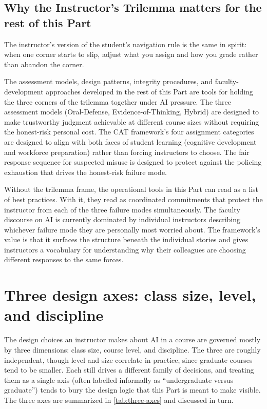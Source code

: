 \documentclass{SIAMbook2023}
\begin{document}
\subsection{Why the Instructor's Trilemma matters for the rest of this Part}
\label{i:subsec:trilemma-stakes}

The instructor's version of the student's navigation rule is the same in spirit: when one corner starts to slip, adjust what you assign and how you grade rather than abandon the corner.

The assessment models, design patterns, integrity procedures, and faculty-development approaches developed in the rest of this Part are tools for holding the three corners of the trilemma together under AI pressure. The three assessment models (Oral-Defense, Evidence-of-Thinking, Hybrid) are designed to make trustworthy judgment achievable at different course sizes without requiring the honest-risk personal cost. The CAT framework's four assignment categories are designed to align with both faces of student learning (cognitive development and workforce preparation) rather than forcing instructors to choose. The fair response sequence for suspected misuse is designed to protect against the policing exhaustion that drives the honest-risk failure mode.

Without the trilemma frame, the operational tools in this Part can read as a list of best practices. With it, they read as coordinated commitments that protect the instructor from each of the three failure modes simultaneously. The faculty discourse on AI is currently dominated by individual instructors describing whichever failure mode they are personally most worried about. The framework's value is that it surfaces the structure beneath the individual stories and gives instructors a vocabulary for understanding why their colleagues are choosing different responses to the same forces.

\section{Three design axes: class size, level, and discipline}
\label{i:sec:three-axes}%

The design choices an instructor makes about AI in a course are governed mostly by three dimensions: class size, course level, and discipline. The three are roughly independent, though level and size correlate in practice, since graduate courses tend to be smaller. Each still drives a different family of decisions, and treating them as a single axis (often labelled informally as ``undergraduate versus graduate'') tends to bury the design logic that this Part is meant to make visible. The three axes are summarized in \cref{tab:three-axes} and discussed in turn.
\end{document}
